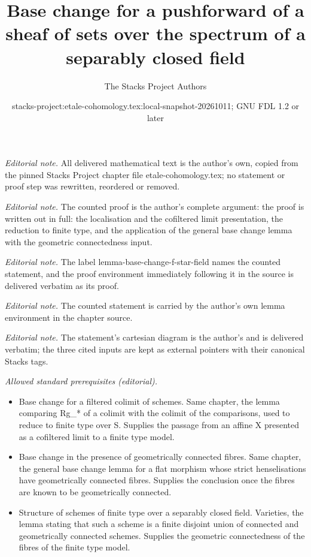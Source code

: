 \documentclass[10pt,a4paper]{amsart}
\title{Base change for a pushforward of a sheaf of sets over the spectrum of a separably closed field}
\author{The Stacks Project Authors}
\date{stacks-project:etale-cohomology.tex:local-snapshot-20261011; GNU FDL 1.2 or later}
\theoremstyle{plain}
\theoremstyle{definition}
\theoremstyle{remark}
\numberwithin{equation}{subsection}
\begin{document}
\maketitle
\noindent\textit{Editorial note.} All delivered mathematical text is the author's own, copied from the pinned Stacks Project chapter file etale-cohomology.tex; no statement or proof step was rewritten, reordered or removed.\par\medskip
\noindent\textit{Editorial note.} The counted proof is the author's complete argument: the proof is written out in full: the localisation and the cofiltered limit presentation, the reduction to finite type, and the application of the general base change lemma with the geometric connectedness input.\par\medskip
\noindent\textit{Editorial note.} The label lemma-base-change-f-star-field names the counted statement, and the proof environment immediately following it in the source is delivered verbatim as its proof.\par\medskip
\noindent\textit{Editorial note.} The counted statement is carried by the author's own lemma environment in the chapter source.\par\medskip
\noindent\textit{Editorial note.} The statement's cartesian diagram is the author's and is delivered verbatim; the three cited inputs are kept as external pointers with their canonical Stacks tags.\par\medskip
\noindent\textit{Allowed standard prerequisites (editorial).}\begin{itemize}
\item Base change for a filtered colimit of schemes. Same chapter, the lemma comparing Rg\_* of a colimit with the colimit of the comparisons, used to reduce to finite type over S. Supplies the passage from an affine X presented as a cofiltered limit to a finite type model.
\item Base change in the presence of geometrically connected fibres. Same chapter, the general base change lemma for a flat morphism whose strict henselisations have geometrically connected fibres. Supplies the conclusion once the fibres are known to be geometrically connected.
\item Structure of schemes of finite type over a separably closed field. Varieties, the lemma stating that such a scheme is a finite disjoint union of connected and geometrically connected schemes. Supplies the geometric connectedness of the fibres of the finite type model.
\end{itemize}\medskip
\end{document}
